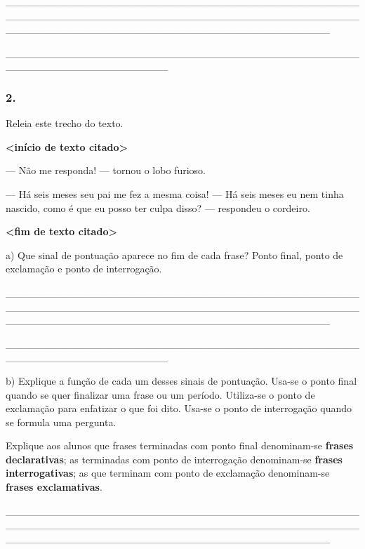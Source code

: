 \_\_\_\_\_\_\_\_\_\_\_\_\_\_\_\_\_\_\_\_\_\_\_\_\_\_\_\_\_\_\_\_\_\_\_\_\_\_\_\_\_\_\_\_\_\_\_\_\_\_\_\_\_\_\_\_\_\_\_\_\_\_\_\_\_\_\_\_\_\_\_\_\_\_\_\_\_\_\_\_\_\_\_\_\_\_\_\_\_\_\_\_\_\_\_\_\_\_\_\_\_\_\_\_\_\_\_\_\_\_\_\_\_\_\_\_\_\_\_\_\_\_\_\_\_\_\_\_\_\_\_\_\_\_\_\_\_\_\_\_

\_\_\_\_\_\_\_\_\_\_\_\_\_\_\_\_\_\_\_\_\_\_\_\_\_\_\_\_\_\_\_\_\_\_\_\_\_\_\_\_\_\_\_\_\_\_\_\_\_\_\_\_\_\_\_\_\_\_\_\_\_\_\_\_\_\_\_\_\_\_

\subsubsection{2. }\label{section-33}

Releia este trecho do texto.

\textbf{\textless{}início de texto citado\textgreater{}}

--- Não me responda! --- tornou o lobo furioso.

--- Há seis meses seu pai me fez a mesma coisa! --- Há seis meses eu nem
tinha nascido, como é que eu posso ter culpa disso? --- respondeu o
cordeiro.

\textbf{\textless{}fim de texto citado\textgreater{}}

a) Que sinal de pontuação aparece no fim de cada frase? Ponto final,
ponto de exclamação e ponto de interrogação.

\protect\hypertarget{_Hlk127460239}{}{}\_\_\_\_\_\_\_\_\_\_\_\_\_\_\_\_\_\_\_\_\_\_\_\_\_\_\_\_\_\_\_\_\_\_\_\_\_\_\_\_\_\_\_\_\_\_\_\_\_\_\_\_\_\_\_\_\_\_\_\_\_\_\_\_\_\_\_\_\_\_\_\_\_\_\_\_\_\_\_\_\_\_\_\_\_\_\_\_\_\_\_\_\_\_\_\_\_\_\_\_\_\_\_\_\_\_\_\_\_\_\_\_\_\_\_\_\_\_\_\_\_\_\_\_\_\_\_\_\_\_\_\_\_\_\_\_\_\_\_\_

\_\_\_\_\_\_\_\_\_\_\_\_\_\_\_\_\_\_\_\_\_\_\_\_\_\_\_\_\_\_\_\_\_\_\_\_\_\_\_\_\_\_\_\_\_\_\_\_\_\_\_\_\_\_\_\_\_\_\_\_\_\_\_\_\_\_\_\_\_\_

b) Explique a função de cada um desses sinais de pontuação. Usa-se o
ponto final quando se quer finalizar uma frase ou um período. Utiliza-se
o ponto de exclamação para enfatizar o que foi dito. Usa-se o ponto de
interrogação quando se formula uma pergunta.

Explique aos alunos que frases terminadas com ponto final denominam-se
\textbf{frases declarativas}; as terminadas com ponto de interrogação
denominam-se \textbf{frases interrogativas}; as que terminam com ponto
de exclamação denominam-se \textbf{frases exclamativas}.

\_\_\_\_\_\_\_\_\_\_\_\_\_\_\_\_\_\_\_\_\_\_\_\_\_\_\_\_\_\_\_\_\_\_\_\_\_\_\_\_\_\_\_\_\_\_\_\_\_\_\_\_\_\_\_\_\_\_\_\_\_\_\_\_\_\_\_\_\_\_\_\_\_\_\_\_\_\_\_\_\_\_\_\_\_\_\_\_\_\_\_\_\_\_\_\_\_\_\_\_\_\_\_\_\_\_\_\_\_\_\_\_\_\_\_\_\_\_\_\_\_\_\_\_\_\_\_\_\_\_\_\_\_\_\_\_\_\_\_\_

